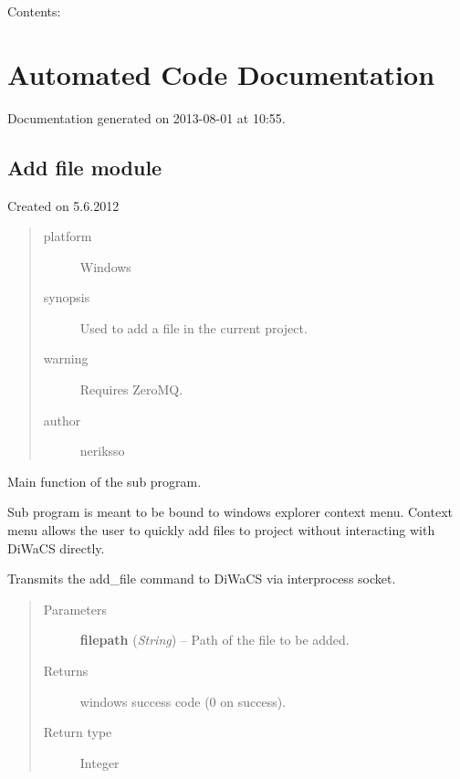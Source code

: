 \documentclass[letterpaper,10pt,english]{sphinxmanual}
\begin{document}
Contents:


\chapter{Automated Code Documentation}
\label{api:automated-code-documentation}\label{api::doc}\label{api:welcome-to-diwacs-documentation}
Documentation generated on 2013-08-01 at 10:55.


\section{Add file module}
\label{add_file:module-add_file}\label{add_file:add-file-module}\label{add_file::doc}
Created on 5.6.2012
\begin{quote}\begin{description}
\item[{platform}] \leavevmode
Windows

\item[{synopsis}] \leavevmode
Used to add a file in the current project.

\item[{warning}] \leavevmode
Requires ZeroMQ.

\item[{author}] \leavevmode
neriksso

\end{description}\end{quote}

\begin{fulllineitems}
\label{add_file:add_file.main}
Main function of the sub program.

Sub program is meant to be bound to windows explorer context menu.
Context menu allows the user to quickly add files to project without
interacting with DiWaCS directly.

Transmits the add\_file command to DiWaCS via interprocess socket.
\begin{quote}\begin{description}
\item[{Parameters}] \leavevmode
\textbf{filepath} (\emph{String}) -- Path of the file to be added.

\item[{Returns}] \leavevmode
windows success code (0 on success).

\item[{Return type}] \leavevmode
Integer

\end{description}\end{quote}

\end{fulllineitems}
\end{document}
